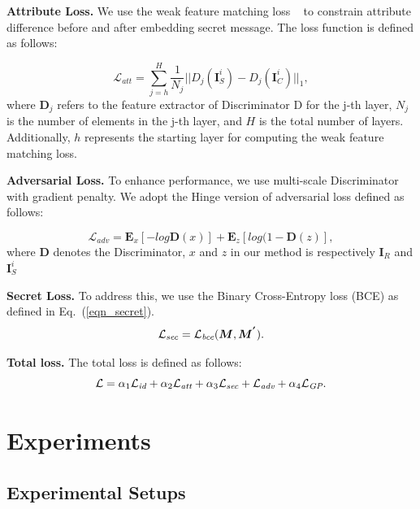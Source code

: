 \documentclass{article}
\begin{document}
\noindent\textbf{Attribute Loss.} 
We use the weak feature matching loss ~\cite{chen2020simswap} to constrain attribute difference before and after embedding secret message.
The loss function is defined as follows:

\begin{equation}
\mathcal{L}_{att}= \sum_{j=h}^{H} \frac{1}{N_{j}}||D_{j}(\bm{I}^{i}_{S})-D_{j}(\bm{I}^{i}_{C})||_{1} ,
\label{eqn_original}
\end{equation}
where $\bm{D}_{j}$ refers to the feature extractor of Discriminator D for the j-th layer, $N_j$ is the number of elements in the j-th layer, and $H$ is the total number of layers. Additionally, $h$ represents the starting layer for computing the weak feature matching loss.


\noindent\textbf{Adversarial Loss.} To enhance performance, we use multi-scale Discriminator with gradient penalty. We adopt the Hinge version of adversarial loss defined as follows: 

\begin{equation}
\mathcal{L}_{adv}=\bm{E}_{x}[-log\bm{D}(x)]+ \bm{E}_{z}[log(1-\bm{D}(z)] ,
\label{eqn_adv}
\end{equation}
where $\bm{D}$ denotes the Discriminator, $x$ and $z$ in our method is respectively $\bm{I}_R$ and $\bm{I}_{S}^{i}$



\noindent\textbf{Secret Loss.} To address this, we use the Binary Cross-Entropy loss (BCE) as defined in Eq.~(\ref{eqn_secret}).
\begin{equation}
\mathcal{L}_{\emph{sec}}=\mathcal{L}_{\emph{bce}}(\bm{M},\bm{M^{'}}) .
\label{eqn_secret}
\end{equation}



\textbf{Total loss. }The total loss is defined as follows:
\begin{equation}
\mathcal{L}=\alpha _{1}\mathcal{L}_{\emph{id}}+\alpha _{2} \mathcal{L}_{\emph{att}}+\alpha _{3}\mathcal{L}_{\emph{sec}}+\mathcal{L}_{\emph{adv}}+\alpha _{4}\mathcal{L}_{\emph{GP}} .
\label{eqn_total_loss}
\end{equation}

\section{Experiments}

\subsection{Experimental Setups}
\end{document}
